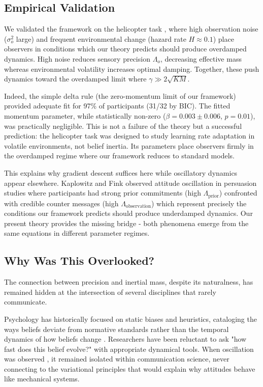 \documentclass[12pt]{article}
\begin{document}
\subsection{Empirical Validation}

We validated the framework on the helicopter task \citet{mcguire2014, nassar2010, nassar2012}, where high observation noise ($\sigma_o^2$ large) and frequent environmental change (hazard rate $H \approx 0.1$) place observers in conditions which our theory predicts should produce overdamped dynamics. High noise reduces sensory precision $\Lambda_o$, decreasing effective mass whereas environmental volatility increases optimal damping. Together, these push dynamics toward the overdamped limit where $\gamma \gg 2\sqrt{KM}$.

Indeed, the simple delta rule (the zero-momentum limit of our framework) provided adequate fit for 97\% of participants (31/32 by BIC). The fitted momentum parameter, while statistically non-zero ($\beta = 0.003 \pm 0.006$, $p = 0.01$), was practically negligible. This is not a failure of the theory but a successful prediction: the helicopter task was designed to study learning rate adaptation in volatile environments, not belief inertia. Its parameters place observers firmly in the overdamped regime where our framework reduces to standard models.

This explains why gradient descent suffices here while oscillatory dynamics appear elsewhere. Kaplowitz and Fink \citet{kaplowitz1992} observed attitude oscillation in persuasion studies where participants had strong prior commitments (high $\Lambda_{\text{prior}}$) confronted with credible counter messages (high $\Lambda_{\text{observation}}$) which represent precisely the conditions our framework predicts should produce underdamped dynamics. Our present theory provides the missing bridge -  both phenomena emerge from the same equations in different parameter regimes.

\subsection{Why Was This Overlooked?}

The connection between precision and inertial mass, despite its naturalness, has remained hidden at the intersection of several disciplines that rarely communicate. 

Psychology has historically focused on static biases and heuristics, cataloging the ways beliefs deviate from normative standards rather than the temporal dynamics of how beliefs change \citet{nickerson1998}. Researchers have been reluctant to ask "how fast does this belief evolve?" with appropriate dynamical tools. When oscillation was observed \citet{kaplowitz1983, fink2002}, it remained isolated within communication science, never connecting to the variational principles that would explain why attitudes behave like mechanical systems.
\end{document}
